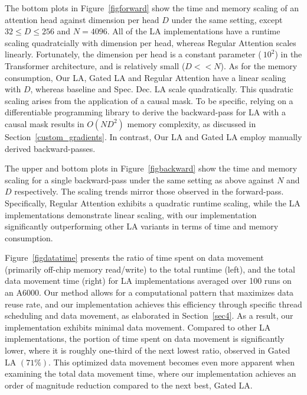 \par The bottom plots in Figure~\ref{figforward} show the time and memory scaling of an attention head against dimension per head $D$ under the same setting, except $32\leq D\leq 256$ and $N = 4096$. All of the LA implementations have a runtime scaling quadratcially with dimension per head, whereas Regular Attention scales linearly. Fortunately, the dimension per head is a constant parameter ($~10^2$) in the Transformer architecture, and is relatively small ($D<<N$). As for the memory consumption, Our LA, Gated LA and Regular Attention have a linear scaling with $D$, whereas baseline and Spec. Dec. LA scale quadratically. This quadratic scaling arises from the application of a causal mask. To be specific, relying on a differentiable programming library to derive the backward-pass for LA with a causal mask results in $O(ND^2)$ memory complexity, as discussed in Section~\ref{custom_gradients}. In contrast, Our LA and Gated LA employ manually derived backward-passes. 

\par The upper and bottom plots in Figure~\ref{figbackward} show the time and memory scaling for a single backward-pass under the same setting as above against $N$ and $D$ respectively. The scaling trends mirror those observed in the forward-pass. Specifically, Regular Attention exhibits a quadratic runtime scaling, while the LA implementations demonstrate linear scaling, with our implementation significantly outperforming other LA variants in terms of time and memory consumption. 

\par Figure~\ref{figdatatime} presents the ratio of time spent on data movement (primarily off-chip memory read/write) to the total runtime (left), and the total data movement time (right) for LA implementations averaged over 100 runs on an A6000. Our method allows for a computational pattern that maximizes data reuse rate, and our implementation achieves this efficiency through specific thread scheduling and data movement, as elaborated in Section~\ref{sec4}. As a result, our implementation exhibits minimal data movement. Compared to other LA implementations, the portion of time spent on data movement is significantly lower, where it is roughly one-third of the next lowest ratio, observed in Gated LA $(71\%)$. This optimized data movement becomes even more apparent when examining the total data movement time, where our implementation achieves an order of magnitude reduction compared to the next best, Gated LA.

